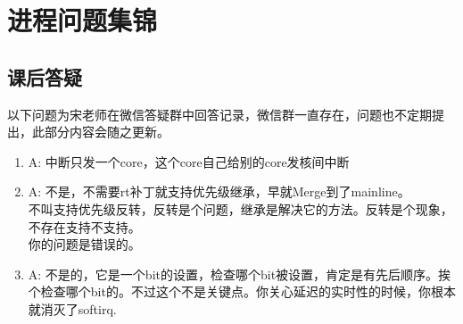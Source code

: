

\partabstractfp{}
\partabstractrp{}

\part{进程问题集锦}


\chapter{课后答疑}

以下问题为宋老师在微信答疑群中回答记录，微信群一直存在，问题也不定期提出，此部分内容会随之更新。
\begin{enumerate}
  \item 
\begin{tcolorbox}[colback=green!5,colframe=green!75!black]
\tcblower
A: 中断只发一个core，这个core自己给别的core发核间中断
\end{tcolorbox}

  \item 
\begin{tcolorbox}[colback=green!5,colframe=green!75!black]
\tcblower
A: 不是，不需要rt补丁就支持优先级继承，早就Merge到了mainline。\\
不叫支持优先级反转，反转是个问题，继承是解决它的方法。反转是个现象，不存在支持不支持。\\
你的问题是错误的。
\end{tcolorbox}


  \item
\begin{tcolorbox}[colback=green!5,colframe=green!75!black]
\tcblower
A: 不是的，它是一个bit的设置，检查哪个bit被设置，肯定是有先后顺序。挨个检查哪个bit的。不过这个不是关键点。你关心延迟的实时性的时候，你根本就消灭了softirq.
\end{tcolorbox}


\end{enumerate}

